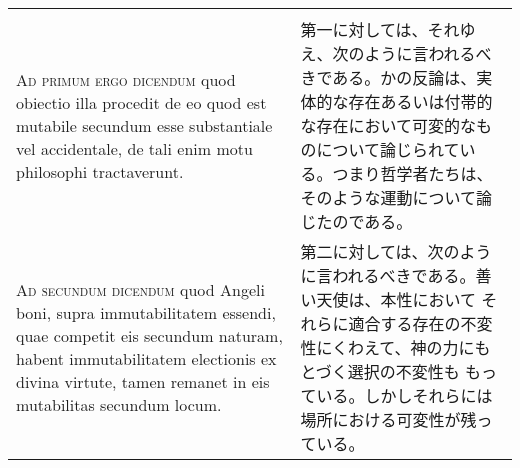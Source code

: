 \documentclass[10pt]{jsarticle} %
\begin{document}
\begin{longtable}{p{21em}p{21em}}
\\




\\



{\scshape Ad primum ergo dicendum} quod obiectio illa procedit de eo
quod est mutabile secundum esse substantiale vel accidentale, de tali
enim motu philosophi tractaverunt.

&

第一に対しては、それゆえ、次のように言われるべきである。かの反論は、実
体的な存在あるいは付帯的な存在において可変的なものについて論じられてい
る。つまり哲学者たちは、そのような運動について論じたのである。

\\

{\scshape Ad secundum dicendum} quod Angeli boni, supra
immutabilitatem essendi, quae competit eis secundum naturam, habent
immutabilitatem electionis ex divina virtute, tamen remanet in eis
mutabilitas secundum locum.

&


第二に対しては、次のように言われるべきである。善い天使は、本性において
それらに適合する存在の不変性にくわえて、神の力にもとづく選択の不変性も
もっている。しかしそれらには場所における可変性が残っている。


\end{longtable}
\end{document}

